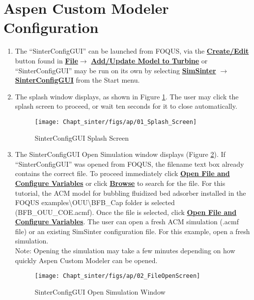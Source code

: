 \section{Aspen Custom Modeler Configuration}
\label{sec.tut.simsinter.acm}
\begin{enumerate}

\item The ``SinterConfigGUI'' can be launched from FOQUS, via the
  \textbf{\underline{Create/Edit}} button found in
  \textbf{\underline{File}}$\rightarrow$ \textbf{\underline{Add/Update Model to
      Turbine}}    or ``SinterConfigGUI'' may be  run on its
  own by selecting \textbf{\underline{SimSinter}} $\rightarrow$ \textbf{\underline{SinterConfigGUI}} from the Start menu.

\item	The splash window displays, as shown in Figure \ref{fig.sinter.acm.splash}. The user may click the splash screen to proceed, or wait ten seconds for it to close automatically.
\begin{figure}[H]
	\begin{center}
		\texttt{[image: Chapt\_sinter/figs/ap/01\_Splash\_Screen]}
		\caption{SinterConfigGUI Splash Screen}
		\label{fig.sinter.acm.splash}
	\end{center}
\end{figure}

\item	The SinterConfigGUI Open Simulation window displays (Figure \ref{fig.sinter.acm.openpage}). If ``SinterConfigGUI'' was
  opened from FOQUS, the filename text box already contains the correct file. To proceed immediately click \textbf{\underline{Open File and Configure Variables}} or click \textbf{\underline{Browse}} to search for the file. For this tutorial, the ACM model for bubbling fluidized bed adsorber installed in the FOQUS examples\textbackslash OUU\textbackslash BFB\_Cap folder is selected (BFB\_OUU\_COE.acmf). Once the file is selected, click \textbf{\underline{Open File and Configure Variables}}. The user can open a fresh ACM simulation (.acmf file) or an existing SimSinter configuration file. For this example, open a fresh simulation.\\
  
  Note: Opening the simulation may take a few minutes depending on how quickly Aspen Custom Modeler can be opened. 
	\begin{figure}[H]
		\begin{center}
			\texttt{[image: Chapt\_sinter/figs/ap/02\_FileOpenScreen]}
			\caption{SinterConfigGUI Open Simulation Window}
			\label{fig.sinter.acm.openpage}
		\end{center}
	\end{figure}



\end{enumerate}
